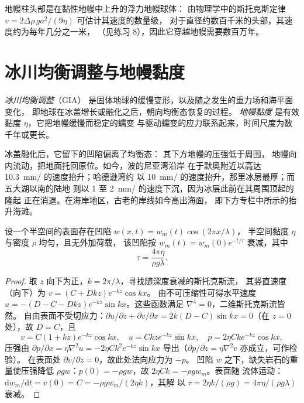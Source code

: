 地幔柱头部是在黏性地幔中上升的浮力地幔球体：
由物理学中的斯托克斯定律 $v = 2\Delta\rho\,ga^2/(9\eta)$ 可估计其速度的数量级，
对于直径约数百千米的头部，其速度约为每年几分之一米，
（见练习 8），因此它穿越地幔需要数百万年。

\section{冰川均衡调整与地幔黏度}\label{sec:b3:mantle-convection:gia}

\begin{definition}\label{def:b3:mantle-convection:gia}
\emph{冰川均衡调整}（GIA）
是固体地球的缓慢变形，以及随之发生的重力场和海平面变化，
即地球在冰盖增长或融化之后，朝向均衡态恢复的过程。
\emph{地幔黏度}
是有效黏度 $\eta$，它把地幔缓慢而稳定的蠕变
与驱动蠕变的应力联系起来，时间尺度为数千年或更长。
\end{definition}

冰盖融化后，它留下的凹陷偏离了均衡态：
其下方地幔的压强低于周围，
地幔向内流动，把地面托回原位。如今，波的尼亚湾沿岸
在于默奥附近以高达 \qty{10.3}{mm/} 的速度抬升；哈德逊湾约
以 \qty{10}{mm/} 的速度抬升，那里冰层最厚；而五大湖以南的陆地
则以 1 至 \qty{2}{mm/} 的速度下沉，因为冰层此前在其周围顶起的隆起
正在消退。在海岸地区，古老的岸线如今高出海面，
即下方专栏中所示的抬升海滩。

\begin{theorem}[黏性半空间的松弛]\label{thm:b3:mantle-convection:relaxation}
设一个半空间的表面存在凹陷 $w(x, t) = w_m(t)\cos(2\pi x/\lambda)$，
半空间黏度 $\eta$ 与密度 $\rho$ 均匀，且无外加荷载，
该凹陷按 $w_m(t) = w_m(0)e^{-t/\tau}$ 衰减，其中
\[
  \tau = \frac{4\pi\eta}{\rho g\lambda} .
\]
\end{theorem}

\begin{proof}
取 $z$ 向下为正，$k = 2\pi/\lambda$，寻找随深度衰减的斯托克斯流，
其竖直速度（向下）为 $v = (C + Dkz)e^{-kz}\cos kx$。
由不可压缩性可得水平速度 $u = -(D - C - Dkz)e^{-kz}\sin
kx$。这些函数满足 $\nabla^4 = 0$，二维斯托克斯流皆然。
自由表面不受切应力：$\partial u/\partial
z + \partial v/\partial x = 2k(D - C)\sin kx = 0$（在 $z = 0$ 处），故 $D = C$，且
\[
  v = C(1 + kz)e^{-kz}\cos kx,\quad u = Ckze^{-kz}\sin kx,\quad
  p = 2\eta Cke^{-kz}\cos kx,
\]
压强由 $\partial p/\partial x = \eta\nabla^2u = -2\eta
Ck^2e^{-kz}\sin kx$ 导出（$\partial p/\partial z = \eta\nabla^2v$ 亦成立，可作检验）。
在表面处 $\partial v/\partial z = 0$，故此处法向应力为 $-p$。
凹陷 $w$ 之下，缺失岩石的重量使压强降低 $\rho
gw$：$p(0) = -\rho gw$，故 $2\eta Ck = -\rho gw_m$。表面随
流体运动：$\mathrm dw_m/\mathrm dt = v(0) = C = -\rho gw_m/(2\eta k)$，其解
以 $\tau = 2\eta k/(\rho g) = 4\pi\eta/(\rho g\lambda)$ 衰减。
\end{proof}

